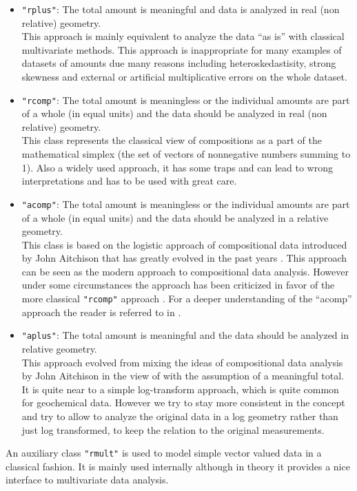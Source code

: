 \documentclass{article}
\newcommand{\code}[1]{{\tt #1}}
\begin{document}
\begin{itemize}
\item {\tt "rplus"}: The total amount is meaningful and data
  is analyzed in real (non relative) geometry.\\
  This approach is mainly equivalent to analyze the data ``as is'' with
  classical multivariate methods. This approach is inappropriate for many
  examples of datasets of amounts due many reasons including
  heteroskedastisity, strong skewness and external or artificial
  multiplicative errors on the whole dataset. 
\item {\tt "rcomp"}: The total amount is meaningless or the individual amounts
  are part of a whole (in equal units) and the data should be analyzed in real
  (non
  relative) geometry. \\
  This class represents the classical view of compositions as a part of the
  mathematical simplex (the set of vectors of nonnegative numbers summing to
  1). Also a widely used approach, it has some traps and can lead to wrong
  interpretations \cite{Cha60} \cite{Ait86} and has to be used with great care.
\item {\tt "acomp"}: The total amount is meaningless or the individual amounts
  are part of a whole (in equal units) and the data should be analyzed in a
  relative geometry.\\
  This class is based on the logistic approach of compositional data
  introduced by John Aitchison \cite{Ait82} \cite{Ait86} \cite{Ait97} that has
  greatly evolved in the past years
  \cite{Ait02} \cite{AG02} \cite{BM+01} \cite{BP+99} \cite{EPMB03} \cite{PE01}
  \cite{PE02} \cite{EP+02}. This approach can be
  seen as the modern approach to compositional data analysis.  However under
  some circumstances the approach has been criticized in favor of the more
  classical \code{"rcomp"} approach \cite{RZ02} \cite{Shu03}. For a deeper
  understanding of the ``acomp'' approach the reader is referred to in
  \cite{BM+01}.
\item {\tt "aplus"}: The total amount is meaningful and the data should be
  analyzed in relative geometry.\\
  This approach evolved from mixing the ideas of compositional data analysis
  by John Aitchison in the view of \cite{Paw03} with the assumption of a
  meaningful total. It is quite near to a simple log-transform approach,
  which is quite common for geochemical data. However we try to stay more
  consistent in the concept and try to allow to analyze the original data in a
  log geometry rather than just log transformed, to keep the relation to the
  original measurements.
\end{itemize}
An auxiliary class {\tt "rmult"} is used to model simple vector valued
data in a classical fashion. It is mainly used internally although in theory
it provides a nice interface to multivariate data analysis.
\end{document}
